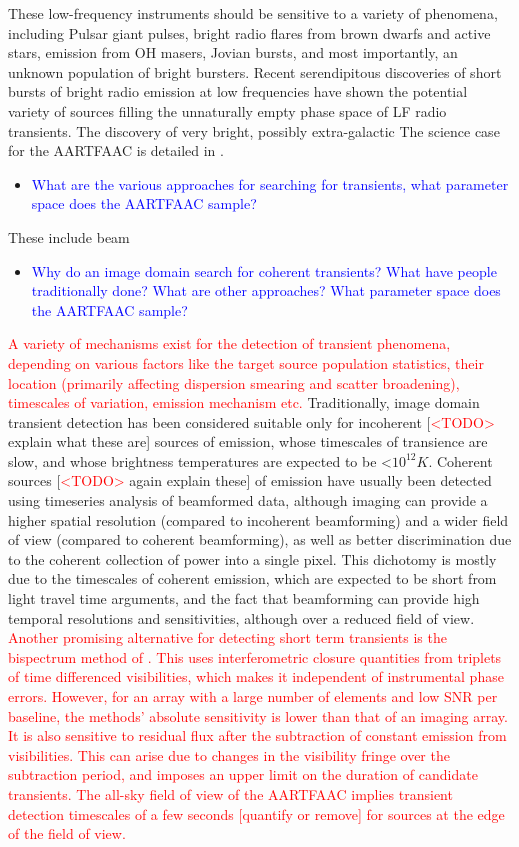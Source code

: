 \documentclass{aa}
\begin{document}
These low-frequency instruments should be sensitive to a variety of
phenomena, including Pulsar giant pulses, bright radio flares from
brown dwarfs and active stars, emission from OH masers, Jovian bursts,
and most importantly, an unknown population of bright bursters. Recent
serendipitous discoveries of short bursts of bright radio emission
at low frequencies\cite{lorimer2007bright} have shown the potential
variety of sources filling the unnaturally empty phase space of LF
radio transients. The discovery of very bright, possibly extra-galactic
 The science case for the AARTFAAC is detailed in \cite{wijers2013aartfaac}.
\begin{itemize}
\item \textcolor{blue}{What are the various approaches for searching for
transients, what parameter space does the AARTFAAC sample?}
\end{itemize}
These include beam
\begin{itemize}
\item \textcolor{blue}{Why do an image domain search for coherent transients?
What have people traditionally done? What are other approaches? What
parameter space does the AARTFAAC sample?}
\end{itemize}
\textcolor{red}{A variety of mechanisms exist for the detection of
transient phenomena, depending on various factors like the target
source population statistics, their location (primarily affecting
dispersion smearing and scatter broadening), timescales of variation,
emission mechanism etc.} Traditionally, image domain transient detection
has been considered suitable only for incoherent {[}\textcolor{red}{<TODO>}
explain what these are{]} sources of emission, whose timescales of
transience are slow, and whose brightness temperatures are expected
to be <$10^{12}K$. Coherent sources {[}\textcolor{red}{<TODO>} again
explain these{]} of emission have usually been detected using timeseries
analysis of beamformed data, although imaging can provide a higher
spatial resolution (compared to incoherent beamforming) and a wider
field of view (compared to coherent beamforming), as well as better
discrimination due to the coherent collection of power into a single
pixel. This dichotomy is mostly due to the timescales of coherent
emission, which are expected to be short from light travel time arguments,
and the fact that beamforming can provide high temporal resolutions
and sensitivities, although over a reduced field of view. \textcolor{red}{Another
promising alternative for detecting short term transients is the bispectrum
method of \cite{law2012all}. This uses interferometric closure quantities
from triplets of time differenced visibilities, which makes it independent
of instrumental phase errors. However, for an array with a large number
of elements and low SNR per baseline, the methods' absolute sensitivity
is lower than that of an imaging array. It is also sensitive to residual
flux after the subtraction of constant emission from visibilities.
This can arise due to changes in the visibility fringe over the subtraction
period, and imposes an upper limit on the duration of candidate transients.
The all-sky field of view of the AARTFAAC implies transient detection
timescales of a few seconds {[}quantify or remove{]} for sources at
the edge of the field of view.}
\end{document}
